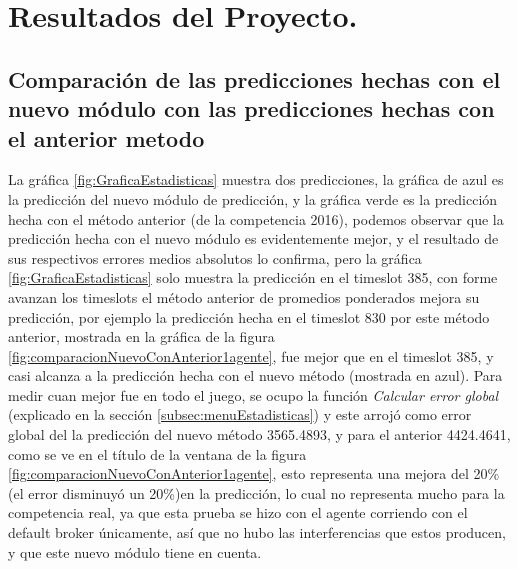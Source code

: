 \chapter{Resultados del Proyecto.}

\section{Comparación de las predicciones hechas con el nuevo módulo con las predicciones hechas con el anterior metodo } \label{subsec:ComparacionesNuevoYviejoMetodo}

La gráfica \ref{fig:GraficaEstadisticas} muestra dos predicciones, la gráfica de azul es la predicción del nuevo módulo de predicción, y la gráfica verde es la predicción hecha con el método anterior (de la competencia 2016), podemos observar que la predicción hecha con el nuevo módulo es evidentemente mejor, y el resultado de sus respectivos errores medios absolutos lo confirma, pero la gráfica \ref{fig:GraficaEstadisticas} solo muestra la predicción en el timeslot 385, con forme avanzan los timeslots el método anterior de promedios ponderados mejora su predicción, por ejemplo la predicción hecha en el timeslot 830 por este método anterior, mostrada en la gráfica de la figura \ref{fig:comparacionNuevoConAnterior1agente}, fue mejor que en el timeslot 385, y casi alcanza a la predicción hecha con el nuevo método (mostrada en azul). Para medir cuan mejor fue en todo el juego, se ocupo la función \textit{Calcular error global} (explicado en la sección \ref{subsec:menuEstadisticas}) y este arrojó como error global del la predicción del nuevo método 3565.4893, y para el anterior 4424.4641, como se ve en el título de la ventana de la figura \ref{fig:comparacionNuevoConAnterior1agente}, esto representa una mejora del 20\% (el error disminuyó un 20\%)en la predicción, lo cual no representa mucho para la competencia real, ya que esta prueba se hizo con el agente corriendo con el default broker únicamente, así que no hubo las interferencias que estos producen, y que este nuevo módulo tiene en cuenta.


